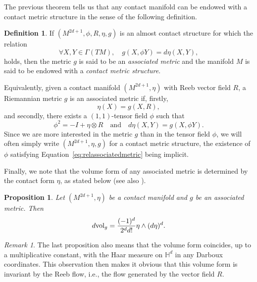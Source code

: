 \documentclass[12pt,a4paper]{amsart}
\theoremstyle{plain}
\newtheorem{proposition}[theorem]{Proposition}
\theoremstyle{definition}
\newtheorem{definition}[theorem]{Definition}
\theoremstyle{remark}
\newtheorem{remark}[theorem]{Remark}
\numberwithin{equation}{section}
\theoremstyle{definition}
\def \Heis{\mathbb{H}}
\numberwithin{equation}{section}
\begin{document}
The previous theorem tells us that any contact manifold can be endowed with a contact metric structure in the sense of the following definition.

\begin{definition}
 \label{def:contactmetricstruct}
 If $(M^{2d+1},\phi,R,\eta,g)$ is an almost contact structure for which the relation 
 \begin{equation}
 \label{eq:associatedmetric}
 \forall X,Y \in \Gamma(TM),\quad g(X,\phi Y) = d\eta(X,Y),
 \end{equation}
 holds, then the metric $g$ is said to be an \emph{associated metric} and the manifold $M$ is said to be endowed with a \emph{contact metric structure}.
\end{definition}

Equivalently, given a contact manifold $(M^{2d+1},\eta)$ with Reeb vector field $R$, a Riemannian metric $g$ is an associated metric if, firstly,
\begin{equation*}
 \eta(X) = g(X,R),
\end{equation*}
and secondly, there exists a $(1,1)$-tensor field $\phi$ such that 
\begin{equation}
 \label{eq:relassociatedmetric}
 \phi^2 = -I+\eta\otimes R\quad\mbox{and}\quad d\eta(X,Y) = g(X,\phi Y).
\end{equation}
Since we are more interested in the metric $g$ than in the tensor field $\phi$, we will often simply write $(M^{2d+1},\eta,g)$ for a contact metric structure,
the existence of $\phi$ satisfying Equation~\eqref{eq:relassociatedmetric} being implicit.

Finally, we note that the volume form of any associated metric is determined by the contact form $\eta$, as stated below (see also \cite[Theorem 4.6]{Blair}).

\begin{proposition}
 Let $(M^{2d+1},\eta)$ be a contact manifold and $g$ be an associated metric. Then
 \begin{equation*}
 d{\rm vol}_g = \frac{(-1)^d}{2^d d!} \eta \wedge (d\eta)^d.
 \end{equation*}
\end{proposition}

\begin{remark}
    The last proposition also means that the volume form coincides, up to a multiplicative constant, with the Haar measure on $\Heis^d$ in any Darboux coordinates. This observation then makes it obvious that this volume form is invariant by the Reeb flow, i.e., the flow generated by the vector field $R$.
\end{remark}
\end{document}
